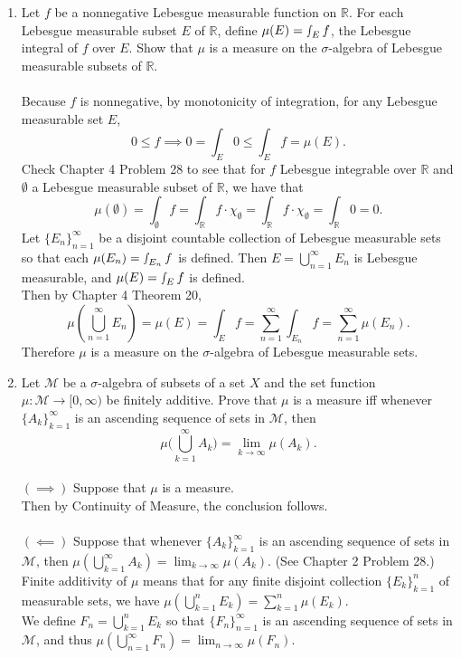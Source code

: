\begin{enumerate}
	\setcounter{enumi}{0}
	\item Let $f$ be a nonnegative Lebesgue measurable function on $\mathbb{R}$. 
	For each Lebesgue measurable subset $E$ of $\mathbb{R}$, define $\mu(E) = \smallint_E f$, the Lebesgue integral of $f$ over $E$.
	Show that $\mu$ is a measure on the $\sigma$-algebra of Lebesgue measurable subsets of $\mathbb{R}$.\\
	\\Because $f$ is nonnegative, by monotonicity of integration, for any Lebesgue measurable set $E$, 
	\[
		0\le f\implies 0=\int_E 0\le \int_E f=\mu(E).
	\]
	Check Chapter 4 Problem 28 to see that for $f$ Lebesgue integrable over $\mathbb{R}$ and $\emptyset$ a Lebesgue measurable subset of $\mathbb{R}$, we have that
	\[
		\mu(\emptyset)=\int_\emptyset f=\int_\mathbb{R} f\cdot\chi_\emptyset=\int_\mathbb{R} f\cdot\chi_\emptyset=\int_\mathbb{R} 0 = 0.
	\]
	Let $\{E_n\}_{n=1}^\infty$ be a disjoint countable collection of Lebesgue measurable sets so that each $\mu(E_n) = \smallint_{E_n} f$ is defined.
	Then $E=\bigcup_{n=1}^\infty E_n$ is Lebesgue measurable, and $\mu(E) = \smallint_E f$ is defined.
	\\Then by Chapter 4 Theorem 20,
	\[
		\mu(\bigcup_{n=1}^\infty E_n)=\mu(E)=\int_E f =\sum_{n=1}^\infty\int_{E_n}f=\sum_{n=1}^\infty\mu(E_n).
	\]
	Therefore $\mu$ is a measure on the $\sigma$-algebra of Lebesgue measurable sets. 
	\item Let $\mathcal{M}$ be a $\sigma$-algebra of subsets of a set $X$ and the set function $\mu : \mathcal{M} \to [0,\infty)$ be finitely additive.
	Prove that $\mu$ is a measure iff whenever $\{A_k\}_{k=1}^\infty$ is an ascending sequence of sets in $\mathcal{M}$, then
	\[
	\mu \biggl ( \bigcup_{k=1}^\infty A_k \biggr ) = \lim_{k \to \infty} \mu(A_k).	
	\]
	\\$(\implies)$ Suppose that $\mu$ is a measure.\\
	Then by Continuity of Measure, the conclusion follows.\\
	\\$(\impliedby)$ Suppose that whenever $\{A_k\}_{k=1}^\infty$ is an ascending sequence of sets in $\mathcal{M}$, then $\mu ( \bigcup_{k=1}^\infty A_k ) = \lim_{k \to \infty} \mu(A_k)$.
	(See Chapter 2 Problem 28.)\\
	Finite additivity of $\mu$ means that for any finite disjoint collection $\{E_k\}_{k=1}^n$ of measurable sets, we have $\mu(\bigcup_{k=1}^n E_k)=\sum_{k=1}^n\mu(E_k)$.
	\\We define $F_n=\bigcup_{k=1}^n E_k$ so that $\{F_n\}_{n=1}^\infty$ is an ascending sequence of sets in $\mathcal{M}$, and thus $\mu ( \bigcup_{n=1}^\infty F_n ) = \lim_{n \to \infty} \mu(F_n)$.

\end{enumerate}
